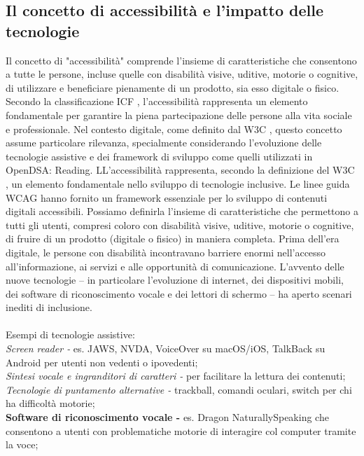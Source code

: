 \documentclass[14pt]{extbook}
\begin{document}
\subsection{Il concetto di accessibilità e l’impatto delle tecnologie}
Il concetto di "accessibilità" comprende l'insieme di caratteristiche che consentono a tutte le persone, incluse quelle con disabilità visive, uditive, motorie o cognitive, di utilizzare e beneficiare pienamente di un prodotto, sia esso digitale o fisico. Secondo la classificazione ICF \cite{who2001icf}, l'accessibilità rappresenta un elemento fondamentale per garantire la piena partecipazione delle persone alla vita sociale e professionale. Nel contesto digitale, come definito dal W3C \cite{w3c2024wai}, questo concetto assume particolare rilevanza, specialmente considerando l'evoluzione delle tecnologie assistive e dei framework di sviluppo come quelli utilizzati in OpenDSA: Reading. LL’accessibilità rappresenta, secondo la definizione del W3C \cite{w3c_wai}, un elemento fondamentale nello sviluppo di tecnologie inclusive. Le linee guida WCAG \cite{wcag20} \cite{wcag21} hanno fornito un framework essenziale per lo sviluppo di contenuti digitali accessibili. Possiamo definirla l’insieme di caratteristiche che permettono a tutti gli utenti, compresi coloro con disabilità visive, uditive, motorie o cognitive, di fruire di un prodotto (digitale o fisico) in maniera completa. Prima dell’era digitale, le persone con disabilità incontravano barriere enormi nell’accesso all’informazione, ai servizi e alle opportunità di comunicazione. L’avvento delle nuove tecnologie – in particolare l’evoluzione di internet, dei dispositivi mobili, dei software di riconoscimento vocale e dei lettori di schermo – ha aperto scenari inediti di inclusione.\\\\
Esempi di tecnologie assistive:\\

\textit{Screen reader -} es. JAWS, NVDA, VoiceOver su macOS/iOS, TalkBack su Android per utenti non vedenti o ipovedenti;\\

\textit{Sintesi vocale e ingranditori di caratteri -} per facilitare la lettura dei contenuti;\\

\textit{Tecnologie di puntamento alternative -} trackball, comandi oculari, switch per chi ha difficoltà motorie;\\

\textbf{Software di riconoscimento vocale -} es. Dragon NaturallySpeaking che consentono a utenti con problematiche motorie di interagire col computer tramite la voce;\\
\end{document}
